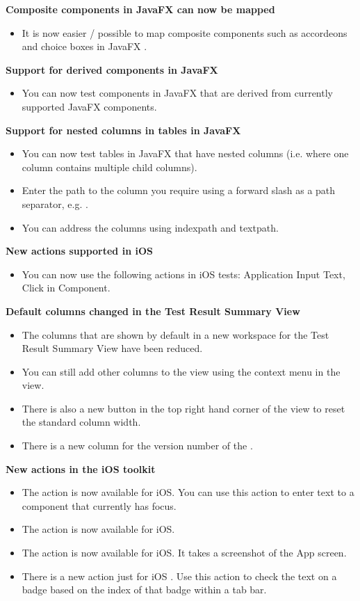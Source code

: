 \textbf{Composite components in JavaFX can now be mapped}
\begin{itemize}
\item It is now easier / possible to map composite components such as accordeons and choice boxes in JavaFX \gdauts{}. 
\end{itemize}

\textbf{Support for derived components in JavaFX}
\begin{itemize}
\item You can now test components in JavaFX \gdauts{} that are derived from currently supported JavaFX components. 
\end{itemize}

\textbf{Support for nested columns in tables in JavaFX}
\begin{itemize}
\item You can now test tables in JavaFX that have nested columns (i.e. where one column contains multiple child columns). 
\item Enter the path to the column you require using a forward slash as a path separator, e.g. .
\item You can address the columns using indexpath and textpath.
\end{itemize}


\textbf{New actions supported in iOS}
\begin{itemize}
\item You can now use the following actions in iOS tests: Application Input Text, Click in Component.
\end{itemize}

\textbf{Default columns changed in the Test Result Summary View}
\begin{itemize}
\item The columns that are shown by default in a new workspace for the Test Result Summary View have been reduced.
\item You can still add other columns to the view using the context menu in the view.
\item There is also a new button in the top right hand corner of the view to reset the standard column width.
\item There is a new column for the version number of the \gdproject{}.
\end{itemize}

\textbf{New actions in the iOS toolkit}
\begin{itemize}
\item The action  is now available for iOS. You can use this action to enter text to a component that currently has focus.
\item The action  is now available for iOS.
\item The action  is now available for iOS. It takes a screenshot of the App screen.
\item There is a new action just for iOS . Use this action to check the text on a badge based on the index of that badge within a tab bar. 
\end{itemize}

